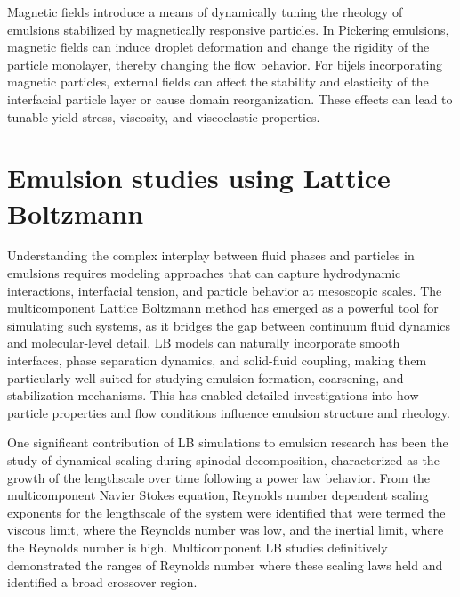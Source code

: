 Magnetic fields introduce a means of dynamically tuning the rheology of emulsions stabilized by magnetically responsive particles. 
\cite{qiao_magnetorheological_2012} In Pickering emulsions, magnetic fields can induce droplet deformation and change the rigidity of the particle monolayer, thereby changing the flow behavior. 
\cite{qiao_magnetorheological_2012} For bijels incorporating magnetic particles, external fields can affect the stability and 
elasticity of the interfacial particle layer or cause domain reorganization. These effects can lead to tunable yield stress, viscosity, and viscoelastic properties.

\section{Emulsion studies using Lattice Boltzmann}

Understanding the complex interplay between fluid phases and particles in emulsions requires modeling approaches that can capture hydrodynamic interactions, interfacial tension, and particle 
behavior at mesoscopic scales. The multicomponent Lattice Boltzmann method has emerged as a powerful tool for simulating such systems, as it bridges the gap between continuum fluid dynamics 
and molecular-level detail. LB models can naturally incorporate smooth interfaces, phase separation dynamics, and solid-fluid coupling, making them particularly well-suited for studying 
emulsion formation, coarsening, and stabilization mechanisms. This has enabled detailed investigations into how particle properties and flow conditions influence emulsion structure and rheology.

One significant contribution of LB simulations to emulsion research has been the study of dynamical scaling during spinodal decomposition, characterized as the growth of the lengthscale
over time following a power law behavior. \cite{siggia_late_1979, furukawa_role_1994} From the multicomponent Navier Stokes equation, Reynolds number dependent scaling exponents for the 
lengthscale of the system were identified that were termed the viscous limit, where the Reynolds number was low, and the inertial limit, where the Reynolds number is high. \cite{kendon_inertial_2001} 
Multicomponent LB studies definitively demonstrated the ranges of Reynolds number where these scaling laws held and identified a broad crossover region. \cite{kendon_inertial_2001, kendon_3d_1999}

